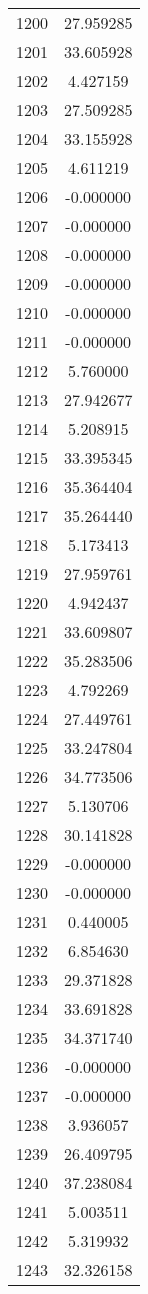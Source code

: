 \documentclass[12pt]{article}
\begin{document}
\begin{longtable}{@{}cc@{}}
1200 & 27.959285 \\
1201 & 33.605928 \\
1202 & 4.427159 \\
1203 & 27.509285 \\
1204 & 33.155928 \\
1205 & 4.611219 \\
1206 & -0.000000 \\
1207 & -0.000000 \\
1208 & -0.000000 \\
1209 & -0.000000 \\
1210 & -0.000000 \\
1211 & -0.000000 \\
1212 & 5.760000 \\
1213 & 27.942677 \\
1214 & 5.208915 \\
1215 & 33.395345 \\
1216 & 35.364404 \\
1217 & 35.264440 \\
1218 & 5.173413 \\
1219 & 27.959761 \\
1220 & 4.942437 \\
1221 & 33.609807 \\
1222 & 35.283506 \\
1223 & 4.792269 \\
1224 & 27.449761 \\
1225 & 33.247804 \\
1226 & 34.773506 \\
1227 & 5.130706 \\
1228 & 30.141828 \\
1229 & -0.000000 \\
1230 & -0.000000 \\
1231 & 0.440005 \\
1232 & 6.854630 \\
1233 & 29.371828 \\
1234 & 33.691828 \\
1235 & 34.371740 \\
1236 & -0.000000 \\
1237 & -0.000000 \\
1238 & 3.936057 \\
1239 & 26.409795 \\
1240 & 37.238084 \\
1241 & 5.003511 \\
1242 & 5.319932 \\
1243 & 32.326158 \\

\end{longtable}
\end{document}

